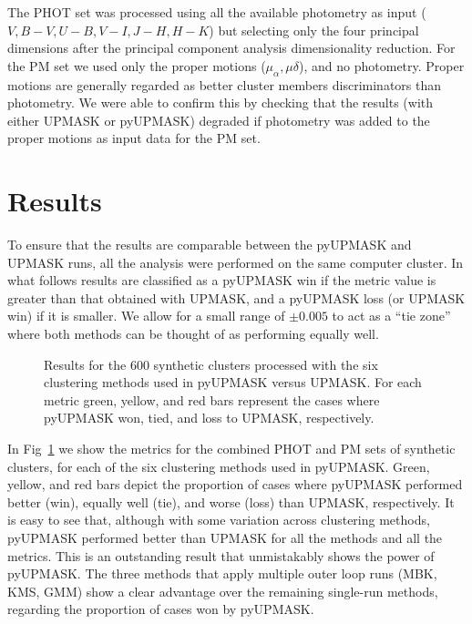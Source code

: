 \documentclass{aa}
\begin{document}

 The PHOT set was processed using all the available photometry as input ($V,
 B-V, U-B, V-I, J-H, H-K$) but selecting only the four principal dimensions
 after the principal component analysis dimensionality reduction.
 For the PM set we used only the proper motions ($\mu_{\alpha}, \mu{\delta}$),
 and no photometry. Proper motions are generally regarded as better cluster
 members discriminators than photometry. We were able to confirm this by
 checking that the results (with either UPMASK or pyUPMASK) degraded if
 photometry was added to the proper motions as input data for the PM set.




\section{Results}
 \label{sec:results}

 To ensure that the results are comparable between the pyUPMASK and UPMASK runs,
 all the analysis were performed on the same computer cluster. In what follows
 results are classified as a pyUPMASK win if the metric value is greater than
 that obtained with UPMASK, and a pyUPMASK loss (or UPMASK win) if it is
 smaller. We allow for a small range of $\pm0.005$ to act as a ``tie zone''
 where both methods can be thought of as performing equally well.\\

 \begin{figure}
 \caption{Results for the 600 synthetic clusters processed with the six
 clustering methods used in pyUPMASK versus UPMASK.
 For each metric green, yellow, and red bars represent the cases
 where pyUPMASK won, tied, and loss to UPMASK, respectively.}
 \label{fig:allmethods}
 \end{figure}

 In Fig~\ref{fig:allmethods} we show the metrics for the combined PHOT and PM
 sets of synthetic clusters, for each of the six clustering methods used in
 pyUPMASK. Green, yellow, and red bars depict the proportion of cases where
 pyUPMASK performed better (win), equally well (tie), and worse (loss) than
 UPMASK, respectively.
 It is easy to see that, although with some variation across clustering methods,
 pyUPMASK performed better than UPMASK for all the methods and all the metrics.
 This is an outstanding result that unmistakably shows the power of pyUPMASK.
 The three methods that apply multiple outer loop runs (MBK, KMS, GMM) show a
 clear advantage over the remaining single-run methods, regarding the
 proportion of cases won by pyUPMASK.
\end{document}
